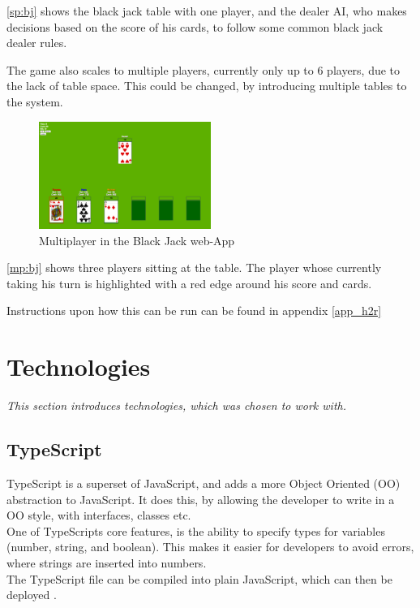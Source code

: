 \documentclass[a4paper]{article}
\begin{document}
\autoref{sp:bj} shows the black jack table with one player, and the dealer AI, who makes decisions based on the score of his cards, to follow some common black jack dealer rules.

The game also scales to multiple players, currently only up to 6 players, due to the lack of table space. This could be changed, by introducing multiple tables to the system.

\begin{figure}[hbt]
  \centering
  \includegraphics[width=0.5\textwidth]{images/multiplayer}	
  \caption{Multiplayer in the Black Jack web-App}
  \label{mp:bj}
\end{figure}

\autoref{mp:bj} shows three players sitting at the table. The player whose currently taking his turn is highlighted with a red edge around his score and cards.

Instructions upon how this can be run can be found in appendix \autoref{app_h2r}




\section{Technologies}
\label{sec_tech}
\textit{This section introduces technologies, which was chosen to work with.}
\subsection{TypeScript}
TypeScript is a superset of JavaScript, and adds a more Object Oriented (OO) abstraction to JavaScript. It does this, by allowing the developer to write in a OO style, with interfaces, classes etc.\\
One of TypeScripts core features, is the ability to specify types for variables (number, string, and boolean). This makes it easier for developers to avoid errors, where strings are inserted into numbers.\\
The TypeScript file can be compiled into plain JavaScript, which can then be deployed \cite{tsc}.
\end{document}
